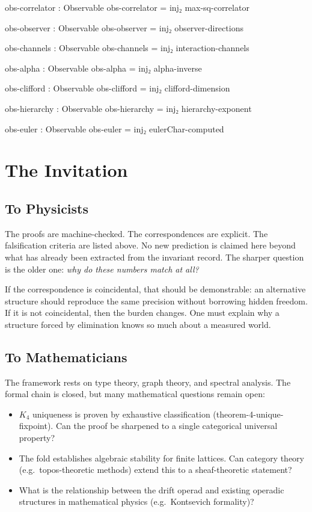 \documentclass[11pt,a4paper]{book}
\def\texttt#1{#1}%
\begin{document}
\begin{code}
  obs-correlator : Observable
  obs-correlator = inj₂ max-sq-correlator

  obs-observer   : Observable
  obs-observer   = inj₂ observer-directions

  obs-channels   : Observable
  obs-channels   = inj₂ interaction-channels

  obs-alpha      : Observable
  obs-alpha      = inj₂ alpha-inverse

  obs-clifford   : Observable
  obs-clifford   = inj₂ clifford-dimension

  obs-hierarchy  : Observable
  obs-hierarchy  = inj₂ hierarchy-exponent

  obs-euler      : Observable
  obs-euler      = inj₂ eulerChar-computed
\end{code}

\chapter{The Invitation}

\section{To Physicists}

The proofs are machine-checked. The correspondences are explicit. The
falsification criteria are listed above. No new prediction is claimed
here beyond what has already been extracted from the invariant record.
The sharper question is the older one: \emph{why do these numbers
match at all?}

If the correspondence is coincidental, that should be demonstrable: an
alternative structure should reproduce the same precision without
borrowing hidden freedom. If it is not coincidental, then the burden
changes. One must explain why a structure forced by elimination knows
so much about a measured world.

\section{To Mathematicians}

The framework rests on type theory, graph theory, and spectral
analysis. The formal chain is closed, but many mathematical questions
remain open:

\begin{itemize}
\item $K_4$ uniqueness is proven by exhaustive classification
  (\texttt{theorem-4-unique-fixpoint}).  Can the proof be sharpened to a
  single categorical universal property?
\item The fold establishes algebraic stability for finite lattices.  Can
  category theory (e.g.\ topos-theoretic methods) extend this to a
  sheaf-theoretic statement?
\item What is the relationship between the drift operad and existing
  operadic structures in mathematical physics (e.g.\ Kontsevich formality)?
\end{itemize}
\end{document}
